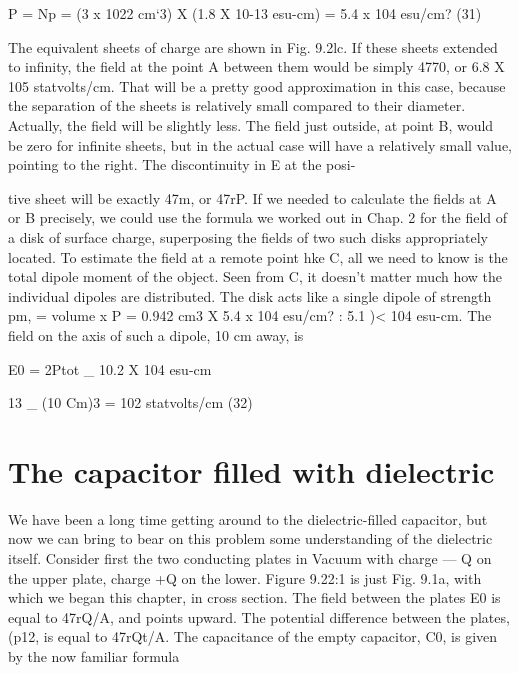 \begin{equation}
\end{equation}
P = Np = (3 x 1022 cm‘3) X (1.8 X 10-13 esu-cm)
= 5.4 x 104 esu/cm? (31)

The equivalent sheets of charge are shown in Fig. 9.2lc. If these
sheets extended to infinity, the field at the point A between them
would be simply 4770, or 6.8 X 105 statvolts/cm. That will be a
pretty good approximation in this case, because the separation of
the sheets is relatively small compared to their diameter. Actually,
the field will be slightly less. The field just outside, at point B, would
be zero for infinite sheets, but in the actual case will have a relatively
small value, pointing to the right. The discontinuity in E at the posi-

tive sheet will be exactly 47m, or 47rP. If we needed to calculate the
fields at A or B precisely, we could use the formula we worked out
in Chap. 2 for the field of a disk of surface charge, superposing the
fields of two such disks appropriately located. To estimate the field
at a remote point hke C, all we need to know is the total dipole
moment of the object. Seen from C, it doesn't matter much how the
individual dipoles are distributed. The disk acts like a single dipole
of strength pm, = volume x P = 0.942 cm3 X 5.4 x 104 esu/cm? :
5.1 )< 104 esu-cm. The field on the axis of such a dipole, 10 cm
away, is

\begin{equation}
\end{equation}
E0 = 2Ptot _ 10.2 X 104 esu-cm

13 _ (10 Cm)3 = 102 statvolts/cm (32)

\section{The capacitor filled with dielectric}

We have been a long time getting around to the dielectric-filled
capacitor, but now we can bring to bear on this problem some understanding
of the dielectric itself. Consider first the two conducting
plates in Vacuum with charge  --- Q on the upper plate, charge +Q
on the lower. Figure 9.22:1 is just Fig. 9.1a, with which we began
this chapter, in cross section. The field between the plates E0 is
equal to 47rQ/A, and points upward. The potential difference between
the plates, (p12, is equal to 47rQt/A. The capacitance of the
empty capacitor, C0, is given by the now familiar formula

